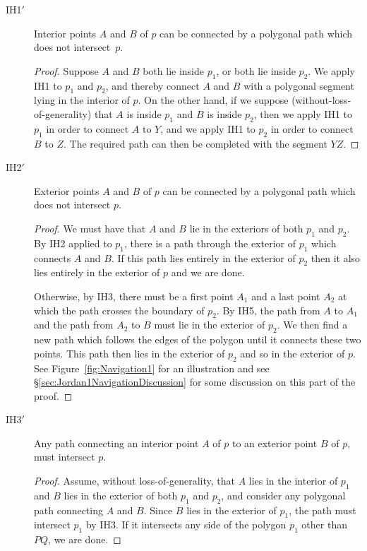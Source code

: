 \begin{description}
\item[IH{1}$'$] Interior points $A$ and $B$ of $p$ can be connected by a polygonal path which does not intersect~$p$.
  \begin{proof}
    Suppose $A$ and $B$ both lie inside $p_1$, or both lie inside $p_2$. We apply IH1 to $p_1$ and $p_2$, and thereby connect $A$ and $B$ with a polygonal segment lying in the interior of $p$. On the other hand, if we suppose (without-loss-of-generality) that $A$ is inside $p_1$ and $B$ is inside $p_2$, then we apply IH1 to $p_1$ in order to connect $A$ to $Y$, and we apply IH1 to $p_2$ in order to connect $B$ to $Z$. The required path can then be completed with the segment $YZ$.
  \end{proof}
\item[IH{2}$'$] Exterior points $A$ and $B$ of $p$ can be connected by a polygonal path which does not intersect $p$.
  \begin{proof}
    We must have that $A$ and $B$ lie in the exteriors of both $p_1$ and $p_2$. By IH2 applied to $p_1$, there is a path through the exterior of $p_1$ which connects $A$ and $B$. If this path lies entirely in the exterior of $p_2$ then it also lies entirely in the exterior of $p$ and we are done. 

    Otherwise, by IH3, there must be a first point $A_1$ and a last point $A_2$ at which the path crosses the boundary of $p_2$. By IH5, the path from $A$ to $A_1$ and the path from $A_2$ to $B$ must lie in the exterior of $p_2$. We then find a new path which follows the edges of the polygon until it connects these two points. This path then lies in the exterior of $p_2$ and so in the exterior of $p$. See Figure~\ref{fig:Navigation1} for an illustration and see \S\ref{sec:Jordan1NavigationDiscussion} for some discussion on this part of the proof.
  \end{proof}
\item[IH{3}$'$] Any path connecting an interior point $A$ of $p$ to an exterior point $B$ of $p$, must intersect $p$.
  \begin{proof}
    Assume, without loss-of-generality, that $A$ lies in the interior of $p_1$ and $B$ lies in the exterior of both $p_1$ and $p_2$, and consider any polygonal path connecting $A$ and $B$. Since $B$ lies in the exterior of $p_1$, the path must intersect $p_1$ by IH3. If it intersects any side of the polygon $p_1$ other than $PQ$, we are done.


\end{proof}
\end{description}
